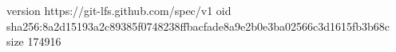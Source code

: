 version https://git-lfs.github.com/spec/v1
oid sha256:8a2d15193a2c89385f0748238ffbacfade8a9e2b0e3ba02566c3d1615fb3b68c
size 174916
